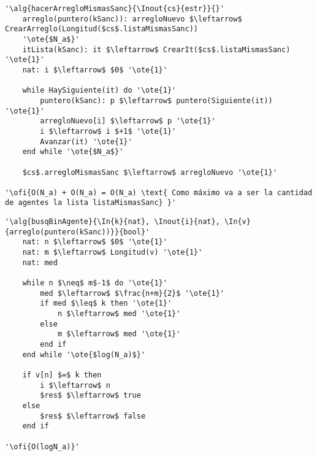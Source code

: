 \begin{lstlisting}[mathescape]
'\alg{hacerArregloMismasSanc}{\Inout{cs}{estr}}{}'
	arreglo(puntero(kSanc)): arregloNuevo $\leftarrow$ CrearArreglo(Longitud($cs$.listaMismasSanc)) 
	'\ote{$N_a$}'
	itLista(kSanc): it $\leftarrow$ CrearIt($cs$.listaMismasSanc) '\ote{1}'
	nat: i $\leftarrow$ $0$ '\ote{1}'

	while HaySiguiente(it) do '\ote{1}'
		puntero(kSanc): p $\leftarrow$ puntero(Siguiente(it)) '\ote{1}'
		arregloNuevo[i] $\leftarrow$ p '\ote{1}'
		i $\leftarrow$ i $+1$ '\ote{1}'
		Avanzar(it) '\ote{1}'
	end while '\ote{$N_a$}'
	
	$cs$.arregloMismasSanc $\leftarrow$ arregloNuevo '\ote{1}'

'\ofi{O(N_a) + O(N_a) = O(N_a) \text{ Como máximo va a ser la cantidad de agentes la lista listaMismasSanc} }'
\end{lstlisting}

\begin{lstlisting}[mathescape]
'\alg{busqBinAgente}{\In{k}{nat}, \Inout{i}{nat}, \In{v}{arreglo(puntero(kSanc))}}{bool}'
	nat: n $\leftarrow$ $0$ '\ote{1}'
	nat: m $\leftarrow$ Longitud(v) '\ote{1}'
	nat: med
	
	while n $\neq$ m$-1$ do '\ote{1}'
		med $\leftarrow$ $\frac{n+m}{2}$ '\ote{1}'
		if med $\leq$ k then '\ote{1}'
			n $\leftarrow$ med '\ote{1}'
		else
			m $\leftarrow$ med '\ote{1}'
		end if
	end while '\ote{$log(N_a)$}'

	if v[n] $=$ k then
		i $\leftarrow$ n
		$res$ $\leftarrow$ true
	else
		$res$ $\leftarrow$ false
	end if

'\ofi{O(logN_a)}'
\end{lstlisting}

